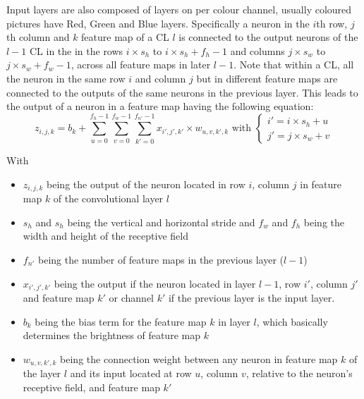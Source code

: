 \documentclass[12pt letter]{report}
\begin{document}
Input layers are also composed of layers on per colour channel, usually
coloured pictures have Red, Green and Blue layers. Specifically a neuron
in the \(i\)th row, \(j\)th column and \(k\) feature map of a CL \(l\)
is connected to the output neurons of the \(l-1\) CL in the in the rows
\(i \times s_h\) to \(i \times s_h + f_h - 1\) and columns
\(j \times s_w\) to \(j \times s_w + f_w - 1\), across all feature maps
in later \(l-1\). Note that within a CL, all the neuron in the same row
\(i\) and column \(j\) but in different feature maps are connected to
the outputs of the same neurons in the previous layer. This leads to the
output of a neuron in a feature map having the following equation: \[
z_{i,j,k} = b_k + \displaystyle\sum_{u = 0}^{f_h - 1} \displaystyle\sum_{v = 0}^{f_w - 1} \displaystyle\sum_{k' = 0}^{f_{n'} - 1} x_{i', j', k'} \times w_{u, v, k', k} \text{ with } \begin{cases}
i' = i \times s_h + u \\
j' = j \times s_w + v
\end{cases}
\]

With

\begin{itemize}
\item
  \(z_{i, j, k}\) being the output of the neuron located in row \(i\),
  column \(j\) in feature map \(k\) of the convolutional layer \(l\)
\item
  \(s_h\) and \(s_h\) being the vertical and horizontal stride and
  \(f_w\) and \(f_h\) being the width and height of the receptive field
\item
  \(f_{n'}\) being the number of feature maps in the previous layer
  (\(l - 1\))
\item
  \(x_{i', j', k'}\) being the output if the neuron located in layer
  \(l-1\), row \(i'\), column \(j'\) and feature map \(k'\) or channel
  \(k'\) if the previous layer is the input layer.
\item
  \(b_k\) being the bias term for the feature map \(k\) in layer \(l\),
  which basically determines the brightness of feature map \(k\)
\item
  \(w_{u, v, k', k}\) being the connection weight between any neuron in
  feature map \(k\) of the layer \(l\) and its input located at row
  \(u\), column \(v\), relative to the neuron's receptive field, and
  feature map \(k'\)
\end{itemize}
\end{document}
